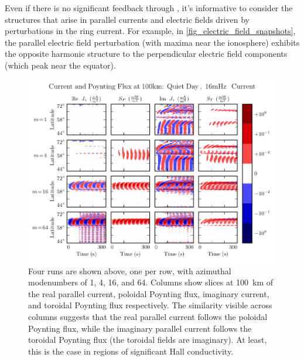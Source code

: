 Even if there is no significant feedback through \farlaw, it's informative to
consider the structures that arise in parallel currents and electric fields
driven by perturbations in the ring current. For example, in
\cref{fig_electric_field_snapshots}, the parallel electric field perturbation
(with maxima near the ionosphere) exhibits the opposite harmonic structure to
the perpendicular electric field components (which peak near the equator). 

\begin{figure}[!htb]
  \centering
  \includegraphics[width=\textwidth]{figures/slice_100km.pdf}
  \caption[Current and Poynting Flux at \SI{100}{\km}]{
    Four runs are shown above, one per row, with azimuthal modenumbers of 1, 4, 16, and 64. Columns show slices at \SI{100}{\km} of the real parallel current, poloidal Poynting flux, imaginary current, and toroidal Poynting flux respectively. The similarity visible across columns suggests that the real parallel current follows the poloidal Poynting flux, while the imaginary parallel current follows the toroidal Poynting flux (the toroidal fields are imaginary). At least, this is the case in regions of significant Hall conductivity. 
  }
  \label{fig_slice_100km}
\end{figure}



